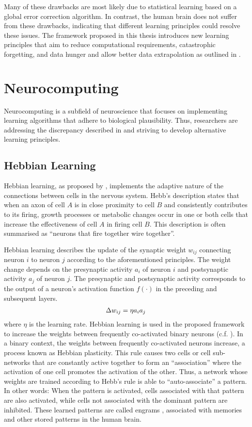 Many of these drawbacks are most likely due to statistical learning based on a global error correction algorithm.
In contrast, the human brain does not suffer from these drawbacks, indicating that different learning principles could resolve these issues.
The framework proposed in this thesis introduces new learning principles that aim to reduce computational requirements, catastrophic forgetting, and data hunger and allow better data extrapolation as outlined in .


\section{Neurocomputing}
Neurocomputing is a subfield of neuroscience that focuses on implementing learning algorithms that adhere to biological plausibility. Thus, researchers are addressing the discrepancy described in  and striving to develop alternative learning principles.

\subsection{Hebbian Learning}
Hebbian learning, as proposed by , implements the adaptive nature of the connections between cells in the nervous system. Hebb's description states that when an axon of cell $A$ is in close proximity to cell $B$ and consistently contributes to its firing, growth processes or metabolic changes occur in one or both cells that increase the effectiveness of cell $A$ in firing cell $B$. This description is often summarised as ``neurons that fire together wire together''.

Hebbian learning describes the update of the synaptic weight $w_{ij}$ connecting neuron $i$ to neuron $j$ according to the aforementioned principles. The weight change depends on the presynaptic activity $a_i$ of neuron $i$ and postsynaptic activity $a_j$ of neuron $j$. The presynaptic and postsynaptic activity corresponds to the output of a neuron's activation function $f(\cdot)$ in the preceding and subsequent layers.
%
\begin{align}\eqlbl{hebb_1}
	\Delta w_{ij} = \eta a_i a_j
\end{align}
%
where \(\eta\) is the learning rate.
Hebbian learning is used in the proposed framework to increase the weights between frequently co-activated binary neurons (c.f. ).
In a binary context, the weights between frequently co-activated neurons increase, a process known as Hebbian plasticity.
This rule causes two cells or cell sub-networks that are constantly active together to form an ``association'' where the activation of one cell promotes the activation of the other.
Thus, a network whose weights are trained according to Hebb's rule is able to ``auto-associate'' a pattern. In other words: When the pattern is activated, cells associated with that pattern are also activated, while cells not associated with the dominant pattern are inhibited. These learned patterns are called engrams , associated with memories and other stored patterns in the human brain.


